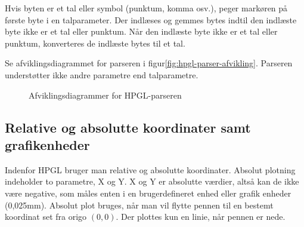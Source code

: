 Hvis byten er et tal eller symbol (punktum, komma osv.), peger markøren på første byte
i en talparameter. Der indlæses og gemmes bytes indtil den indlæste
byte ikke er et tal eller punktum. Når den indlæste byte ikke er et
tal eller punktum, konverteres de indlæste bytes til et tal.

Se afviklingsdiagrammet for parseren i
figur\vref{fig:hpgl-parser-afvikling}. Parseren understøtter ikke
andre parametre end talparametre.

\begin{figure}[htbp]
  \centering
  \qquad
  \caption{Afviklingsdiagrammer for HPGL-parseren}
  \label{fig:hpgl-parser-afvikling}
\end{figure}


\subsection{Relative og absolutte koordinater samt grafikenheder}
\label{sc:relativ-absolut}

Indenfor HPGL bruger man relative og absolutte koordinater. Absolut
plotning indeholder to parametre, X og Y. X og Y er absolutte værdier,
altså kan de ikke være negative, som måles enten i en brugerdefineret
enhed eller grafik enheder (0,025mm). Absolut plot bruges, når man vil
flytte pennen til en bestemt koordinat set fra origo $(0, 0)$. Der
plottes kun en linie, når pennen er nede.


